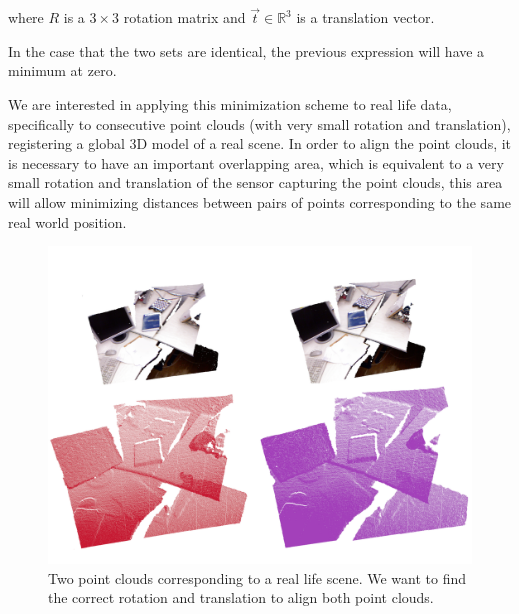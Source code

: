 \noindent where $R$ is a  $3\times3$ rotation matrix and $\vec{t} \in \mathbb{R}^3$ is a translation vector.


In the case that the two sets are identical, the previous expression will have a minimum at zero.

We are interested in applying this minimization scheme to real life data, specifically to consecutive 
point clouds (with very small rotation and translation), registering a global 3D model of 
a real scene. In order to align the point clouds, it is necessary to have an important overlapping 
area, which is equivalent to a very small rotation and translation of the sensor capturing the point clouds, 
this area will allow minimizing distances between pairs of points corresponding to the same real world position.


\begin{figure}[H]
\begin{center}
\includegraphics[scale=0.3]{images/two_clouds}
\caption{Two point clouds corresponding to a real life scene. We want to find the correct rotation and translation to align both point clouds.}
\end{center}
\end{figure}

